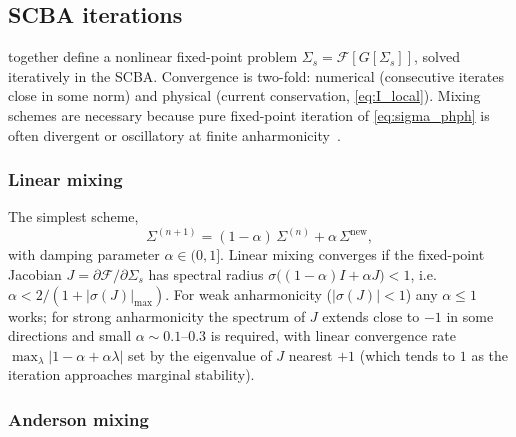 \subsection{SCBA iterations}
\label{sub:scba}

 together define
a nonlinear fixed-point problem $\Sigma_s = \mathcal{F}[G[\Sigma_s]]$,
solved iteratively in the SCBA. Convergence is two-fold: numerical
(consecutive iterates close in some norm) and physical (current
conservation, \cref{eq:I_local}). Mixing schemes are necessary because
pure fixed-point iteration of \cref{eq:sigma_phph} is often divergent or
oscillatory at finite anharmonicity~\cite{wang_nonequilibrium_2007,luisier_atomistic_2012}.

\subsubsection{Linear mixing}

The simplest scheme,
\begin{equation}\label{eq:linear_mix}
  \Sigma^{(n+1)} = (1-\alpha)\,\Sigma^{(n)} + \alpha\,\Sigma^{\mathrm{new}},
\end{equation}
with damping parameter $\alpha \in (0,1]$. Linear mixing converges if
the fixed-point Jacobian
$J = \partial\mathcal{F}/\partial\Sigma_s$ has spectral radius
$\sigma\bigl((1-\alpha) I + \alpha J\bigr) < 1$, i.e.\ $\alpha < 2/(1+|\sigma(J)|_{\max})$.
For weak anharmonicity ($|\sigma(J)|<1$) any $\alpha \le 1$ works; for
strong anharmonicity the spectrum of $J$ extends close to $-1$ in
some directions and small $\alpha\sim 0.1\text{--}0.3$ is required, with
linear convergence rate $\max_\lambda|1-\alpha+\alpha\lambda|$ set by the
eigenvalue of $J$ nearest $+1$ (which tends to $1$ as the iteration approaches
marginal stability).

\subsubsection{Anderson mixing}

